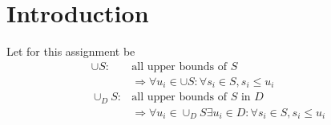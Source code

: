 \section*{Introduction}
Let for this assignment be
\begin{align*}
	\cup S: 	& \text{all upper bounds of } S \\
						& \Rightarrow \forall u_i \in \cup S: \forall s_i \in S, s_i \leq u_i \\
	\cup_D S:	& \text{all upper bounds of } S \text{ in } D \\
						& \Rightarrow \forall u_i \in \cup_D S  \exists u_i \in D: \forall s_i \in S, s_i \leq u_i
\end{align*}
